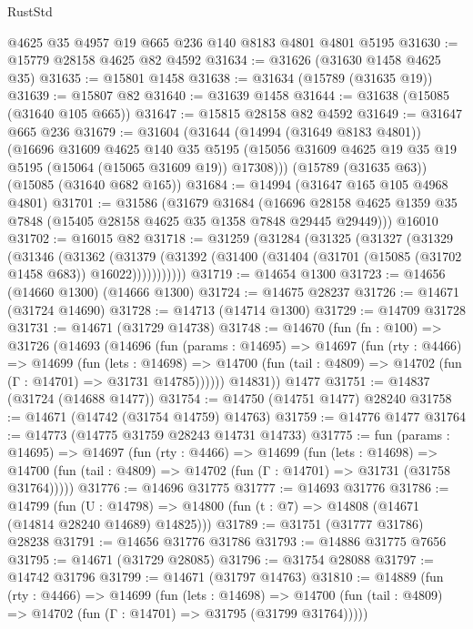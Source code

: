 \begin{lexlean}{RustStd}
\begin{coremodule}
    @4625
    @35
    @4957
    @19
    @665
    @236
    @140
    @8183
    @4801
    @4801
    @5195
@31630 := @15779 @28158 @4625 @82 @4592
@31634 := @31626 (@31630 @1458 @4625 @35)
@31635 := @15801 @1458
@31638 := @31634 (@15789 (@31635 @19))
@31639 := @15807 @82
@31640 := @31639 @1458
@31644 := @31638 (@15085 (@31640 @105 @665))
@31647 := @15815 @28158 @82 @4592
@31649 := @31647 @665 @236
@31679 := @31604
    (@31644
      (@14994 (@31649 @8183 @4801))
      (@16696
        @31609
        @4625
        @140
        @35
        @5195
        (@15056 @31609 @4625 @19 @35 @19 @5195 (@15064 (@15065 @31609 @19)) @17308)))
    (@15789 (@31635 @63))
    (@15085 (@31640 @682 @165))
@31684 := @14994 (@31647 @165 @105 @4968 @4801)
@31701 := @31586
    (@31679
      @31684
      (@16696 @28158 @4625 @1359 @35 @7848 (@15405 @28158 @4625 @35 @1358 @7848 @29445 @29449)))
    @16010
@31702 := @16015 @82
@31718 := @31259
    (@31284
      (@31325
        (@31327
          (@31329
            (@31346
              (@31362
                (@31379
                  (@31392 (@31400 (@31404 (@31701 (@15085 (@31702 @1458 @683)) @16022)))))))))))
@31719 := @14654 @1300
@31723 := @14656 (@14660 @1300) (@14666 @1300)
@31724 := @14675 @28237
@31726 := @14671 (@31724 @14690)
@31728 := @14713 (@14714 @1300)
@31729 := @14709 @31728
@31731 := @14671 (@31729 @14738)
@31748 := @14670
    (fun (fn : @100) =>
    @31726
      (@14693
        (@14696
          (fun (params : @14695) =>
          @14697
            (fun (rty : @4466) =>
            @14699
              (fun (lets : @14698) =>
              @14700 (fun (tail : @4809) => @14702 (fun (Γ : @14701) => @31731 @14785))))))
        @14831))
    @1477
@31751 := @14837 (@31724 (@14688 @1477))
@31754 := @14750 (@14751 @1477) @28240
@31758 := @14671 (@14742 (@31754 @14759) @14763)
@31759 := @14776 @1477
@31764 := @14773 (@14775 @31759 @28243 @14731 @14733)
@31775 := fun (params : @14695) =>
  @14697
    (fun (rty : @4466) =>
    @14699
      (fun (lets : @14698) =>
      @14700 (fun (tail : @4809) => @14702 (fun (Γ : @14701) => @31731 (@31758 @31764)))))
@31776 := @14696 @31775
@31777 := @14693 @31776
@31786 := @14799
    (fun (U : @14798) => @14800 (fun (t : @7) => @14808 (@14671 (@14814 @28240 @14689) @14825)))
@31789 := @31751 (@31777 @31786) @28238
@31791 := @14656 @31776 @31786
@31793 := @14886 @31775 @7656
@31795 := @14671 (@31729 @28085)
@31796 := @31754 @28088
@31797 := @14742 @31796
@31799 := @14671 (@31797 @14763)
@31810 := @14889
    (fun (rty : @4466) =>
    @14699
      (fun (lets : @14698) =>
      @14700 (fun (tail : @4809) => @14702 (fun (Γ : @14701) => @31795 (@31799 @31764)))))

\end{coremodule}
\end{lexlean}
